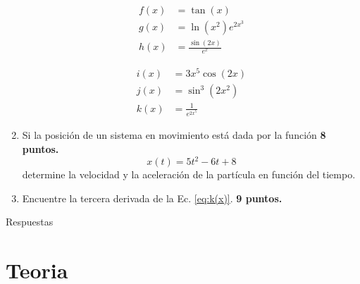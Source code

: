\documentclass{article}
\begin{document}
\begin{enumerate}
\noindent
\begin{minipage}{0.5\linewidth}
\begin{align}
\label{eq:f(x)} f(x) &= \tan(x)  \\
\label{eq:g(x)} g(x) &= \ln(x^{2})e^{2x^{3}}  \\
\label{eq:h(x)} h(x) &= \frac{\sin(2x)}{e^x}  
\end{align}
\end{minipage}%
\begin{minipage}{0.5\linewidth}
\begin{align}
\label{eq:i(x)} i(x) &= 3x^5\cos(2x) \\
\label{eq:j(x)} j(x) &= \sin^{3}(2x^{2})  \\
\label{eq:k(x)} k(x) &= \frac{1}{e^{2x^{5}}}  
\end{align}
\end{minipage}

\item Si la posición de un sistema en movimiento está dada por la función
\hfill \textbf{8 puntos.}
\begin{equation}\label{eq:poscion}
x(t)= 5t^{2} - 6t + 8
\end{equation}
determine la velocidad y la aceleración de la partícula en función del tiempo.

\item Encuentre la tercera derivada de la Ec. \eqref{eq:k(x)}.
\hfill \textbf{9 puntos.}


\end{enumerate}


\clearpage
\setcounter{section}{0}

\begin{center}
{\sc \huge Respuestas}
\end{center}


\section{Teoria} %
\label{sec:resteoria}
\end{document}
